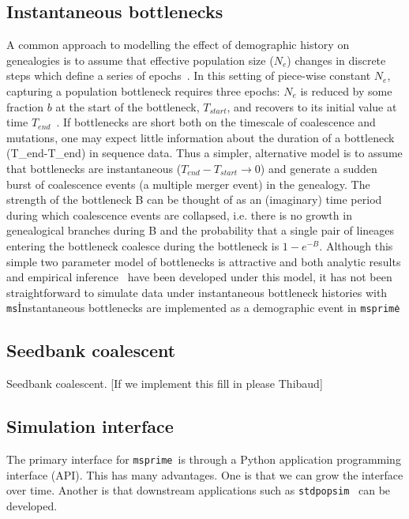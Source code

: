 \documentclass{article}
\newcommand{\msprime}[0]{\texttt{msprime}}
\newcommand{\ms}[0]{\texttt{ms}}
\newcommand{\msprime}[0]{{\texttt{msprime} }}
\newcommand{\ms}[0]{{\texttt{ms} }}
\begin{document}
\subsection*{Instantaneous bottlenecks}
A common approach to modelling the effect of demographic history on genealogies is to assume that effective population size ($N_e$) changes in discrete steps which define a series of epochs~\citep{griffiths1994sampling, marth2004allele, keightley2007joint, li2011inference}. In this setting of piece-wise constant $N_e$, capturing a population bottleneck requires three epochs: $N_e$ is reduced by some fraction $b$ at the start of the bottleneck, $T_{start}$, and recovers to its initial value at time $T_{end}$~\citep{marth2004allele}. If bottlenecks are short both on the timescale of coalescence and mutations, one may expect little information about the duration of a bottleneck (T_end-T_end) in sequence data. Thus a simpler, alternative model is to assume that bottlenecks are instantaneous ($T_{end}-T_{start} \rightarrow 0$) and generate a sudden burst of coalescence events (a multiple merger event) in the genealogy. The strength of the bottleneck B can be thought of as an (imaginary) time period during which coalescence events are collapsed, i.e. there is no growth in genealogical branches during B and the probability that a single pair of lineages entering the bottleneck coalesce during the bottleneck is $1-e^{-B}$. Although this simple two parameter model of bottlenecks is attractive and both analytic results and empirical inference~\citep{griffiths1994sampling, galtier2000detecting, bunnefeld2015inferring} have been developed under this model, it has not been straightforward to simulate data under instantaneous bottleneck histories with \ms\. Instantaneous bottlenecks are implemented as a demographic event in \msprime\.


\subsection*{Seedbank coalescent}
Seedbank coalescent. [If we implement this fill in please Thibaud]

\subsection*{Simulation interface}
The primary interface for \msprime\ is through a Python application
programming interface (API). This has many advantages. One is
that we can grow the interface over time. Another is that
downstream applications such as \texttt{stdpopsim}~\citep{adrion2019community}
can be developed.
\end{document}
